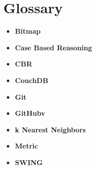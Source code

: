  

\chapter{Glossary}

\begin{itemize}
\item{\textbf{Bitmap}} 
\item {\textbf{Case Based Reasoning}} 
\item {\textbf{CBR}}
\item {\textbf{CouchDB}}  
\item {\textbf{Git}}  
\item {\textbf{GitHubv}}  
\item {\textbf{k Nearest Neighbors}}
\item {\textbf{Metric}}
\item {\textbf{SWING}}

\end{itemize}